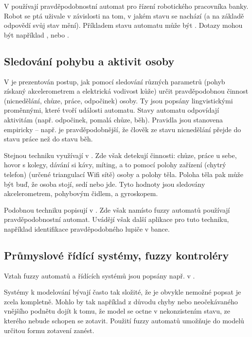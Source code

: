 V \cite{SchYou-ProSimHumMacDia} používají pravděpodobnostní automat pro řízení robotického pracovníka banky. Robot se ptá uživale v závislosti na tom, v jakém stavu se nachází (a na základě odpovědí svůj stav mění). Příkladem stavu automatu může být . Dotazy mohou být například ,  nebo .


\subsection{Sledování pohybu a aktivit osoby}
V \cite{TriHei-LinSumHumActSkiConAcc} je prezentován postup, jak pomocí sledování různých parametrů (pohyb získaný akcelerometrem a elektrická vodivost kůže) určit pravděpodobnou činnost (nicnedělání, chůze, práce, odpočinek) osoby. Ty jsou popsány lingvistickými proměnnými, které tvoří události automatu. Stavy automatu odpovídají aktivitám (např. odpočinek, pomalá chůze, běh). Pravidla jsou stanovena empiricky -- např. je pravděpodobnější, že člověk ze stavu nicnedělání přejde do stavu práce než do stavu běh.

Stejnou techniku využívají v \cite{Alv+-HumActRec+}. Zde však detekují činnosti: chůze, práce u sebe, hovor s kolegy, dávání si kávy, míting, a to pomocí polohy zařízení (chytrý telefon) (určené triangulací Wifi sítě) osoby a polohy těla. Poloha těla pak může být buď, že osoba stojí, sedí nebo jde. Tyto hodnoty jsou sledovány akcelerometrem, pohybovým čidlem, a gyroskopem. 

Podobnou techniku popisují v \cite{TurChe-MacRecHumActSur}. Zde však namísto fuzzy automatů používají pravděpodobnostní automat. Uvádějí však další aplikace pro tuto techniku, například identifikace pravděpodobného lupiče v bance.

\subsection{Průmyslové řídící systémy, fuzzy kontroléry}
Vztah fuzzy automatů a řídících systémů jsou popsány např. v \cite{HeKinSep-DecMakFuzEnvZUsOntCon+, Gra+-ApFuStFuOuFinMaPrRecVioOntAss, WeeFu-FormFuzAutAppModLeaSys, GraFodDri-HybFuzBooAutOntCont}. 

Systémy k modelování bývají často tak složité, že je obvykle nemožné popsat je zcela kompletně. Mohlo by tak například z důvodu chyby nebo neočekávaného vnějšího podnětu dojít k tomu, že model se octne v nekonzistením stavu, ze kterého nebude schopen se zotavit. Použití fuzzy automatů umožňuje do modelů určitou formu zotavení zanést.

